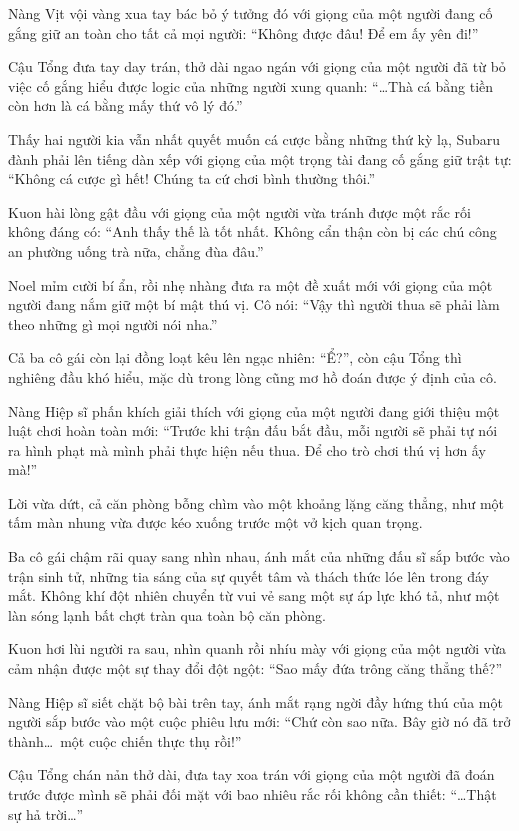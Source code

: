\documentclass[../main.tex]{subfiles}
\begin{document}
Nàng Vịt vội vàng xua tay bác bỏ ý tưởng đó với giọng của một người đang cố gắng giữ an toàn cho tất cả mọi người: ``Không được đâu! Để em ấy yên đi!''

Cậu Tổng đưa tay day trán, thở dài ngao ngán với giọng của một người đã từ bỏ việc cố gắng hiểu được logic của những người xung quanh: ``\dots Thà cá bằng tiền còn hơn là cá bằng mấy thứ vô lý đó.''

Thấy hai người kia vẫn nhất quyết muốn cá cược bằng những thứ kỳ lạ, Subaru đành phải lên tiếng dàn xếp với giọng của một trọng tài đang cố gắng giữ trật tự: ``Không cá cược gì hết! Chúng ta cứ chơi bình thường thôi.''

Kuon hài lòng gật đầu với giọng của một người vừa tránh được một rắc rối không đáng có: ``Anh thấy thế là tốt nhất. Không cẩn thận còn bị các chú công an phường uống trà nữa, chẳng đùa đâu.''

Noel mỉm cười bí ẩn, rồi nhẹ nhàng đưa ra một đề xuất mới với giọng của một người đang nắm giữ một bí mật thú vị. Cô nói: ``Vậy thì người thua sẽ phải làm theo những gì mọi người nói nha.''

Cả ba cô gái còn lại đồng loạt kêu lên ngạc nhiên: ``Ể?'', còn cậu Tổng thì nghiêng đầu khó hiểu, mặc dù trong lòng cũng mơ hồ đoán được ý định của cô.

Nàng Hiệp sĩ phấn khích giải thích với giọng của một người đang giới thiệu một luật chơi hoàn toàn mới: ``Trước khi trận đấu bắt đầu, mỗi người sẽ phải tự nói ra hình phạt mà mình phải thực hiện nếu thua. Để cho trò chơi thú vị hơn ấy mà!''

Lời vừa dứt, cả căn phòng bỗng chìm vào một khoảng lặng căng thẳng, như một tấm màn nhung vừa được kéo xuống trước một vở kịch quan trọng.

Ba cô gái chậm rãi quay sang nhìn nhau, ánh mắt của những đấu sĩ sắp bước vào trận sinh tử, những tia sáng của sự quyết tâm và thách thức lóe lên trong đáy mắt. Không khí đột nhiên chuyển từ vui vẻ sang một sự áp lực khó tả, như một làn sóng lạnh bất chợt tràn qua toàn bộ căn phòng.

Kuon hơi lùi người ra sau, nhìn quanh rồi nhíu mày với giọng của một người vừa cảm nhận được một sự thay đổi đột ngột: ``Sao mấy đứa trông căng thẳng thế?''

Nàng Hiệp sĩ siết chặt bộ bài trên tay, ánh mắt rạng ngời đầy hứng thú của một người sắp bước vào một cuộc phiêu lưu mới: ``Chứ còn sao nữa. Bây giờ nó đã trở thành\dots\ một cuộc chiến thực thụ rồi!''

Cậu Tổng chán nản thở dài, đưa tay xoa trán với giọng của một người đã đoán trước được mình sẽ phải đối mặt với bao nhiêu rắc rối không cần thiết: ``\dots Thật sự hả trời\dots''
\end{document}
